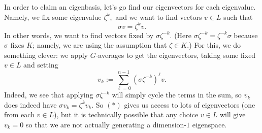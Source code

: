 In order to claim an eigenbasis, let's go find our eigenvectors for each eigenvalue. Namely, we fix some eigenvalue $\zeta^k,$ and we want to find vectors $v\in L$ such that
\[\sigma v=\zeta^kv.\]
In other words, we want to find vectors fixed by $\sigma\zeta^{-k}.$ (Here $\sigma\zeta^{-k}=\zeta^{-k}\sigma$ because $\sigma$ fixes $K$; namely, we are using the assumption that $\zeta\in K.$) For this, we do something clever: we apply $G$-averages to get the eigenvectors, taking some fixed $v\in L$ and setting
\[v_k:=\sum_{\ell=0}^{n-1}\left(\sigma\zeta^{-k}\right)^\ell v.\]
Indeed, we see that applying $\sigma\zeta^{-k}$ will simply cycle the terms in the sum, so $v_k$ does indeed have $\sigma v_k=\zeta^kv_k.$ So $(*)$ gives us access to lots of eigenvectors (one from each $v\in L$), but it is technically possible that any choice $v\in L$ will give $v_k=0$ so that we are not actually generating a dimension-$1$ eigenspace.

